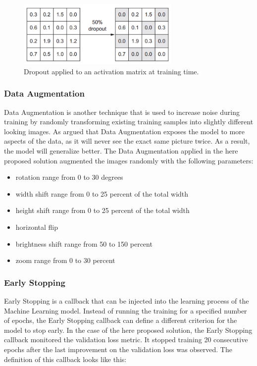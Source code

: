 \begin{figure}[H]
  \begin{center}
  \includegraphics[angle=0, width=0.7\textwidth]{Figures/dropout.PNG}
  \caption{Dropout applied to an activation matrix at training time.\citep{Chollet:2017:DeepLearningPython}}
  \label{fig:Dropout}
  \end{center}
\end{figure}

\subsubsection{Data Augmentation}
Data Augmentation is another technique that is used to increase noise during training by randomly transforming existing training samples into slightly different looking images. As \citet{Chollet:2017:DeepLearningPython} argued that Data Augmentation exposes the model to more aspects of the data, as it will never see the exact same picture twice. As a result, the model will generalize better.
The Data Augmentation applied in the here proposed solution augmented the images randomly with the following parameters:

\begin{itemize}
    \item rotation range from 0 to 30 degrees
    \item width shift range from 0 to 25 percent of the total width
    \item height shift range from 0 to 25 percent of the total width
    \item horizontal flip
    \item brightness shift range from 50 to 150 percent
    \item zoom range from 0 to 30 percent
\end{itemize}


\subsubsection{Early Stopping}
Early Stopping is a callback that can be injected into the learning process of the Machine Learning model. Instead of running the training for a specified number of epochs, the Early Stopping callback can define a different criterion for the model to stop early. In the case of the here proposed solution, the Early Stopping callback monitored the validation loss metric. It stopped training 20 consecutive epochs after the last improvement on the validation loss was observed. The definition of this callback looks like this:

